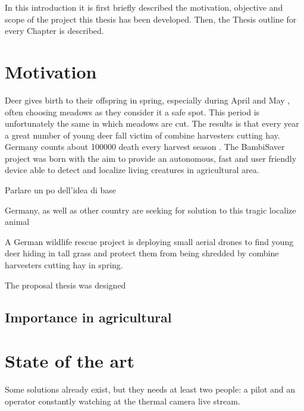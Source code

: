 


In this introduction it is first briefly described the motivation, objective and scope of the project this thesis has been developed. Then, the Thesis outline for every Chapter is described.


\section{Motivation} %
\label{sec:motivation}
 Deer gives birth to their offspring in spring, especially during April and May \cite{MowlingMortality}, often choosing meadows as they consider it a safe spot. This period is unfortunately the same in which meadows are cut. The results is that every year a great number of young deer fall victim of combine harvesters cutting hay. Germany counts about 100000 death every harvest season \cite{MowlingMortality}. The BambiSaver project was born with the aim to provide an autonomous, fast and user friendly device able to detect and localize living creatures in agricultural area.




Parlare un po dell'idea di base 




 Germany, as well as other country are seeking for solution to this tragic localize animal


A German wildlife rescue project is deploying small aerial drones to find young deer hiding in tall grass and protect them from being shredded by combine harvesters cutting hay in spring.{}

The proposal thesis was designed 

\subsection{Importance in agricultural}
\lipsum[7]


\section{State of the art} %
\label{sec:state_of_the_art}

Some solutions already exist, but they needs at least two people: a pilot and an operator constantly watching at the thermal camera live stream.

\lipsum[47]

